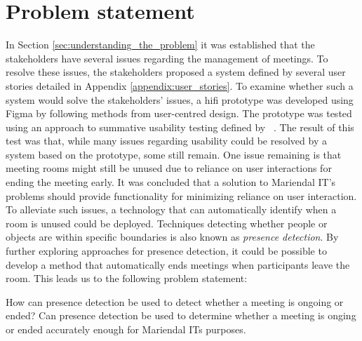 \section{Problem statement}\label{sec:problem_statement}
In Section \ref{sec:understanding_the_problem} it was established that the stakeholders have several issues regarding the management of meetings. 
To resolve these issues, the stakeholders proposed a system defined by several user stories detailed in Appendix \ref{appendix:user_stories}. 
To examine whether such a system would solve the stakeholders' issues, a hifi prototype was developed using Figma\cite{Figma} by following methods from user-centred design.
The prototype was tested using an approach to summative usability testing defined by \citeauthor{lazar2005web}~\cite{lazar2005web}. 
The result of this test was that, while many issues regarding usability could be resolved by a system based on the prototype, some still remain. 
One issue remaining is that meeting rooms might still be unused due to reliance on user interactions for ending the meeting early.
It was concluded that a solution to Mariendal IT's problems should provide functionality for minimizing reliance on user interaction.
To alleviate such issues, a technology that can automatically identify when a room is unused could be deployed. 
Techniques detecting whether people or objects are within specific boundaries is also known as \textit{presence detection}.
By further exploring approaches for presence detection, it could be possible to develop a method that automatically ends meetings when participants leave the room.
This leads us to the following problem statement:
\begin{problem_statement}
    How can presence detection be used to detect whether a meeting is ongoing or ended?
    Can presence detection be used to determine whether a meeting is onging or ended accurately enough for Mariendal ITs purposes.  
\end{problem_statement}

